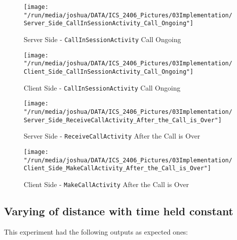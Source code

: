 \documentclass[12pt,svgnames,smaller]{article} %
\begin{document}
		\begin{figure}
			\centering
			\begin{minipage}{.5\textwidth}
				\centering
				\texttt{[image: "/run/media/joshua/DATA/ICS\_2406\_Pictures/03Implementation/Server\_Side\_CallInSessionActivity\_Call\_Ongoing"]}
				\caption{Server Side - \texttt{CallInSessionActivity} Call Ongoing}
				\label{fig:Implementation-Figure13}			
			\end{minipage}%
			\begin{minipage}{0.5\textwidth}
				\centering
				\texttt{[image: "/run/media/joshua/DATA/ICS\_2406\_Pictures/03Implementation/Client\_Side\_CallInSessionActivity\_Call\_Ongoing"]}
				\caption{Client Side - \texttt{CallInSessionActivity} Call Ongoing}
				\label{fig:Implementation-Figure14}
			\end{minipage}
		\end{figure} 		
		
		\begin{figure}
			\centering
			\begin{minipage}{.5\textwidth}
				\centering
				\texttt{[image: "/run/media/joshua/DATA/ICS\_2406\_Pictures/03Implementation/Server\_Side\_ReceiveCallActivity\_After\_the\_Call\_is\_Over"]}
				\caption{Server Side - \texttt{ReceiveCallActivity} After the Call is Over}
				\label{fig:Implementation-Figure15}			
			\end{minipage}%
			\begin{minipage}{0.5\textwidth}
				\centering
				\texttt{[image: "/run/media/joshua/DATA/ICS\_2406\_Pictures/03Implementation/Client\_Side\_MakeCallActivity\_After\_the\_Call\_is\_Over"]}
				\caption{Client Side - \texttt{MakeCallActivity} After the Call is Over}
				\label{fig:Implementation-Figure16}
			\end{minipage}
		\end{figure} 		
	

\clearpage	
	
	\subsection{Varying of distance with time held constant}

			
		This experiment had the following outputs as expected ones:
		
\end{document}
